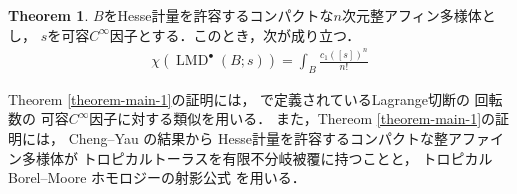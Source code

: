 \documentclass[uplatex,dvipdfmx,12pt]{jsarticle}
\numberwithin{equation}{section}
\theoremstyle{definition}
\newtheorem{theorem}{Theorem}[section]
\newcommand{\opn}[1]{\operatorname{#1}}
\newcommand{\aftersection}{\vspace{-8pt}}
\begin{document}
\begin{theorem}
\label{theorem-main-2}
$B$をHesse計量を許容するコンパクトな$n$次元整アフィン多様体とし，
$s$を可容$C^{\infty}$因子とする．このとき，次が成り立つ．
\begin{align}
\chi(\opn{LMD}^{\bullet}(B;s))=\int_B \frac{c_1([s])^n}{n!}
\end{align}
\end{theorem}

Theorem \ref{theorem-main-1}の証明には，
\cite{auroux2022lagrangian}で定義されているLagrange切断の
回転数の
可容$C^{\infty}$因子に対する類似を用いる．
また，Thereom \ref{theorem-main-1}の証明には，
Cheng--Yau \cite{MR714338}の結果から
Hesse計量を許容するコンパクトな整アファイン多様体が
トロピカルトーラスを有限不分岐被覆に持つことと，
トロピカル Borel--Moore
ホモロジーの射影公式
\cite{gross2019sheaftheoretic}を用いる．

\aftersection

{\small


}
\end{document}
